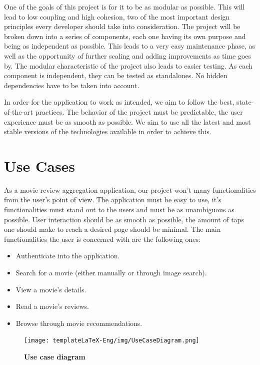 \documentclass[12pt,a4paper,twoside]{report}
\begin{document}
One of the goals of this project is for it to be as modular as possible. This will lead to low coupling and high cohesion, two of the most important design principles every developer should take into consideration. The project will be broken down into a series of components, each one having its own purpose and being as independent as possible. This leads to a very easy maintenance phase, as well as the opportunity of further scaling and adding improvements as time goes by. The modular characteristic of the project also leads to easier testing. As each component is independent, they can be tested as standalones. No hidden dependencies have to be taken into account.

In order for the application to work as intended, we aim to follow the best, state-of-the-art practices. The behavior of the project must be predictable, the user experience must be as smooth as possible. We aim to use all the latest and most stable versions of the technologies available in order to achieve this.

\section{Use Cases}
As a movie review aggregation application, our project won't many functionalities from the user's point of view. The application must be easy to use, it's functionalities must stand out to the users and must be as unambiguous as possible. User interaction should be as smooth as possible, the amount of taps one should make to reach a desired page should be minimal. The main functionalities the user is concerned with are the following ones:
\begin{itemize}
    \item Authenticate into the application.
    \item Search for a movie (either manually or through image search).
    \item View a movie's details.
    \item Read a movie's reviews.
    \item Browse through movie recommendations.
\end{itemize}

 \begin{figure}[H]
    \begin{center}
        \texttt{[image: templateLaTeX-Eng/img/UseCaseDiagram.png]}
        \caption{\bf Use case diagram\footnotemark}
    \end{center}
\end{figure}
\end{document}
